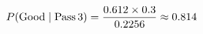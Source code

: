 \documentclass[preview]{standalone}
\begin{document}
\begin{align*}
\special{dvisvgm:raw <g id='unique000'>}P(\mathrm{Good} \mid \mathrm{Pass\,3}) = \frac{0.612 \times 0.3}{0.2256} \approx 0.814\special{dvisvgm:raw </g>}
\end{align*}
\end{document}
